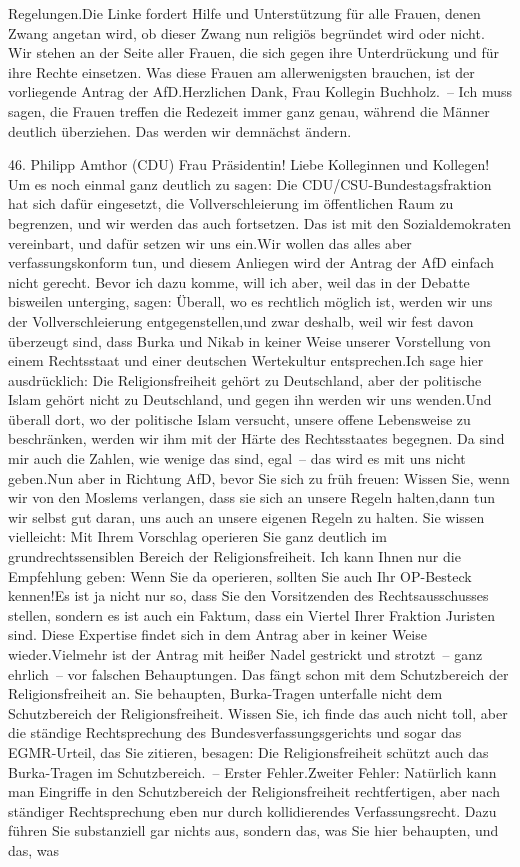 \documentclass{article}
\begin{document}
Regelungen.Die Linke fordert Hilfe und Unterstützung für alle Frauen, denen Zwang angetan wird, ob dieser Zwang nun religiös begründet wird oder nicht. Wir stehen an der Seite aller Frauen, die sich gegen ihre Unterdrückung und für ihre Rechte einsetzen. Was diese Frauen am allerwenigsten brauchen, ist der vorliegende Antrag der AfD.Herzlichen Dank, Frau Kollegin Buchholz. – Ich muss sagen, die Frauen treffen die Redezeit immer ganz genau, während die Männer deutlich überziehen. Das werden wir demnächst ändern.




	46. Philipp Amthor (CDU) Frau Präsidentin! Liebe Kolleginnen und Kollegen! Um es noch einmal ganz deutlich zu sagen: Die CDU/CSU-Bundestagsfraktion hat sich dafür eingesetzt, die Vollverschleierung im öffentlichen Raum zu begrenzen, und wir werden das auch fortsetzen. Das ist mit den Sozialdemokraten vereinbart, und dafür setzen wir uns ein.Wir wollen das alles aber verfassungskonform tun, und diesem Anliegen wird der Antrag der AfD einfach nicht gerecht. Bevor ich dazu komme, will ich aber, weil das in der Debatte bisweilen unterging, sagen: Überall, wo es rechtlich möglich ist, werden wir uns der Vollverschleierung entgegenstellen,und zwar deshalb, weil wir fest davon überzeugt sind, dass Burka und Nikab in keiner Weise unserer Vorstellung von einem Rechtsstaat und einer deutschen Wertekultur entsprechen.Ich sage hier ausdrücklich: Die Religionsfreiheit gehört zu Deutschland, aber der politische Islam gehört nicht zu Deutschland, und gegen ihn werden wir uns wenden.Und überall dort, wo der politische Islam versucht, unsere offene Lebensweise zu beschränken, werden wir ihm mit der Härte des Rechtsstaates begegnen. Da sind mir auch die Zahlen, wie wenige das sind, egal – das wird es mit uns nicht geben.Nun aber in Richtung AfD, bevor Sie sich zu früh freuen: Wissen Sie, wenn wir von den Moslems verlangen, dass sie sich an unsere Regeln halten,dann tun wir selbst gut daran, uns auch an unsere eigenen Regeln zu halten. Sie wissen vielleicht: Mit Ihrem Vorschlag operieren Sie ganz deutlich im grundrechtssensiblen Bereich der Religionsfreiheit. Ich kann Ihnen nur die Empfehlung geben: Wenn Sie da operieren, sollten Sie auch Ihr OP-Besteck kennen!Es ist ja nicht nur so, dass Sie den Vorsitzenden des Rechtsausschusses stellen, sondern es ist auch ein Faktum, dass ein Viertel Ihrer Fraktion Juristen sind. Diese Expertise findet sich in dem Antrag aber in keiner Weise wieder.Vielmehr ist der Antrag mit heißer Nadel gestrickt und strotzt – ganz ehrlich – vor falschen Behauptungen. Das fängt schon mit dem Schutzbereich der Religionsfreiheit an. Sie behaupten, Burka-Tragen unterfalle nicht dem Schutzbereich der Religionsfreiheit. Wissen Sie, ich finde das auch nicht toll, aber die ständige Rechtsprechung des Bundesverfassungsgerichts und sogar das EGMR-Urteil, das Sie zitieren, besagen: Die Religionsfreiheit schützt auch das Burka-Tragen im Schutzbereich. – Erster Fehler.Zweiter Fehler: Natürlich kann man Eingriffe in den Schutzbereich der Religionsfreiheit rechtfertigen, aber nach ständiger Rechtsprechung eben nur durch kollidierendes Verfassungsrecht. Dazu führen Sie substanziell gar nichts aus, sondern das, was Sie hier behaupten, und das, was 
\end{document}
